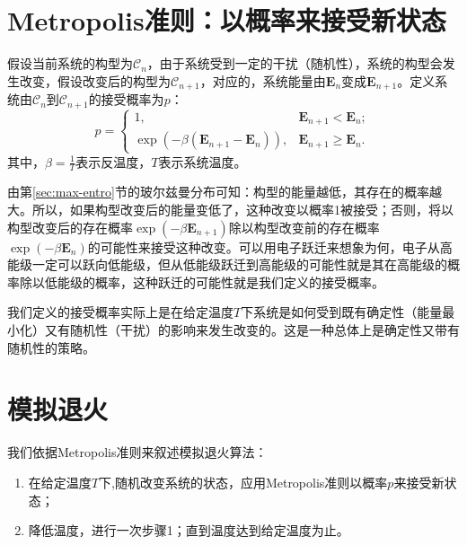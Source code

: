 \documentclass[normal,cn, 11pt]{elegantnote}
\begin{document}
\section{Metropolis准则：以概率来接受新状态}\label{sec:metroplois}
假设当前系统的构型为$\mathcal{C}_n$，由于系统受到一定的干扰（随机性），系统的构型会发生改变，假设改变后的构型为$\mathcal{C}_{n+1}$，对应的，系统能量由$\mathbf{E}_n$变成$\mathbf{E}_{n+1}$。定义系统由$\mathcal{C}_n$到$\mathcal{C}_{n+1}$的接受概率为$p$：
\begin{equation}\label{eq:accept}
  p =
  \begin{cases}
    1, &  \mathbf{E}_{n+1} < \mathbf{E}_n ;\\
    \exp(-\beta(\mathbf{E}_{n+1}-\mathbf{E}_n)), & \mathbf{E}_{n+1} \geq \mathbf{E}_n.
  \end{cases}
\end{equation}
其中，$\beta=\frac{1}{T}$表示反温度，$T$表示系统温度。

由第\ref{sec:max-entro}节的玻尔兹曼分布可知：构型的能量越低，其存在的概率越大。所以，如果构型改变后的能量变低了，这种改变以概率1被接受；否则，将以构型改变后的存在概率$\exp(-\beta\mathbf{E}_{n+1})$除以构型改变前的存在概率$\exp(-\beta\mathbf{E}_{n})$的可能性来接受这种改变。可以用电子跃迁来想象为何，电子从高能级一定可以跃向低能级，但从低能级跃迁到高能级的可能性就是其在高能级的概率除以低能级的概率，这种跃迁的可能性就是我们定义的接受概率。

我们定义的接受概率实际上是在给定温度$T$下系统是如何受到既有确定性（能量最小化）又有随机性（干扰）的影响来发生改变的。这是一种总体上是确定性又带有随机性的策略。
\section{模拟退火}\label{sec:simulate}

我们依据Metropolis准则来叙述模拟退火算法：
\begin{enumerate}
  \item 在给定温度$T$下,随机改变系统的状态，应用Metropolis准则以概率$p$来接受新状态；
  \item 降低温度，进行一次步骤1；直到温度达到给定温度为止。
\end{enumerate}
\end{document}
